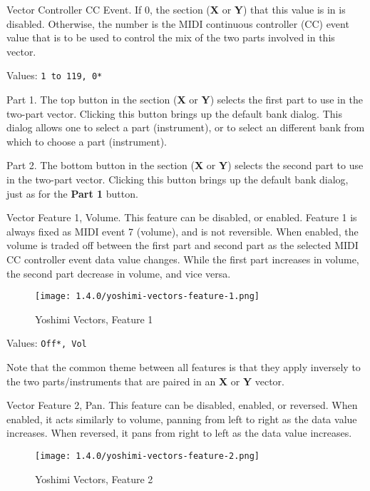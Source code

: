    Vector Controller CC Event.
   If 0, the section (\textbf{X} or \textbf{Y}) that this value is in is
   disabled.  Otherwise, the number is the MIDI continuous controller (CC)
   event value that is to be used to control the mix of the two parts involved
   in this vector.

   Values: \texttt{1 to 119, 0*}

   Part 1.
   The top button in the section (\textbf{X} or \textbf{Y}) selects the first
   part to use in the two-part vector.  Clicking this button brings up the
   default bank dialog.  This dialog allows one to select a part (instrument),
   or to select an different bank from which to choose a part (instrument).

   Part 2.
   The bottom button in the section (\textbf{X} or \textbf{Y}) selects the
   second part to use in the two-part vector.  Clicking this button brings up
   the default bank dialog, just as for the \textbf{Part 1} button.

   Vector Feature 1, Volume.
   This feature can be disabled, or enabled.  Feature 1 is always fixed as MIDI
   event 7 (volume), and is not reversible.
   When enabled, the volume is traded off between the first part and second part
   as the selected MIDI CC controller event data value changes.
   While the first part increases in volume, the second part decrease in
   volume, and vice versa.

\begin{figure}[H]
   \centering 
   \texttt{[image: 1.4.0/yoshimi-vectors-feature-1.png]}
   \caption{Yoshimi Vectors, Feature 1}
   \label{fig:yoshimi_vectors_feature_1}
\end{figure}

   Values: \texttt{Off*, Vol}

   Note that the common theme between all features is that they apply inversely
   to the two parts/instruments that are paired in an \textbf{X}
   or \textbf{Y} vector.

   Vector Feature 2, Pan.
   This feature can be disabled, enabled, or reversed.
   When enabled, it acts similarly to volume, panning from left to right as the
   data value increases.
   When reversed, it pans from right to left as the data value increases.

\begin{figure}[H]
   \centering 
   \texttt{[image: 1.4.0/yoshimi-vectors-feature-2.png]}
   \caption{Yoshimi Vectors, Feature 2}
   \label{fig:yoshimi_vectors_feature_2}
\end{figure}

